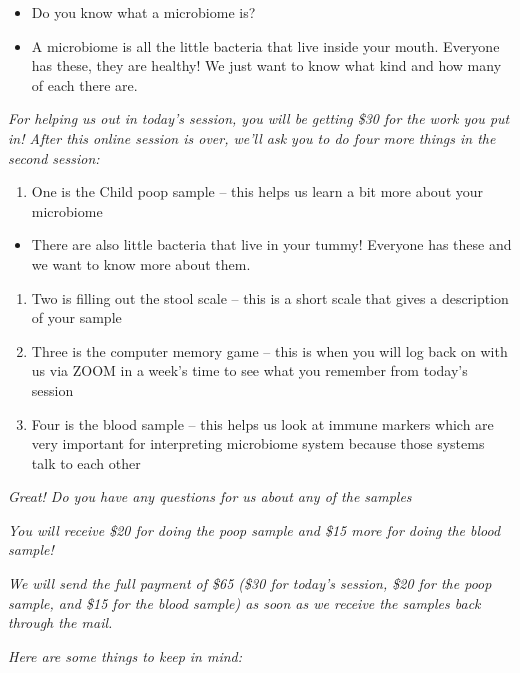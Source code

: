 \documentclass[]{book}
\providecommand{\tightlist}{%
  \setlength{\itemsep}{0pt}\setlength{\parskip}{0pt}}
\begin{document}
\begin{itemize}
\item
  Do you know what a microbiome is?
\item
  A microbiome is all the little bacteria that live inside your mouth. Everyone has these, they are healthy! We just want to know what kind and how many of each there are.
\end{itemize}

\emph{For helping us out in today's session, you will be getting \$30 for the work you put in! After this online session is over, we'll ask you to do four more things in the second session:}

\begin{enumerate}
\def\labelenumi{\arabic{enumi}.}
\tightlist
\item
  One is the Child poop sample -- this helps us learn a bit more about your microbiome
\end{enumerate}

\begin{itemize}
\tightlist
\item
  There are also little bacteria that live in your tummy! Everyone has these and we want to know more about them.
\end{itemize}

\begin{enumerate}
\def\labelenumi{\arabic{enumi}.}
\setcounter{enumi}{1}
\item
  Two is filling out the stool scale -- this is a short scale that gives a description of your sample
\item
  Three is the computer memory game -- this is when you will log back on with us via ZOOM in a week's time to see what you remember from today's session
\item
  Four is the blood sample -- this helps us look at immune markers which are very important for interpreting microbiome system because those systems talk to each other
\end{enumerate}

\emph{Great! Do you have any questions for us about any of the samples}

\emph{You will receive \$20 for doing the poop sample and \$15 more for doing the blood sample!}

\emph{We will send the full payment of \$65 (\$30 for today's session, \$20 for the poop sample, and \$15 for the blood sample) as soon as we receive the samples back through the mail.}

\emph{Here are some things to keep in mind:}
\end{document}
